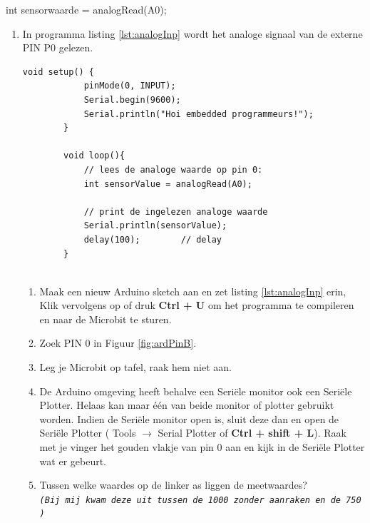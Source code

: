 int sensorwaarde = \textcolor{arduinoOrange}{analogRead}(A0);

\begin{enumerate}
	\item In programma listing \ref{lst:analogInp} wordt het analoge signaal van de externe PIN P0 gelezen.
	\begin{lstlisting}[numbers=none ,caption= inlezen via een analoog signaal.,label={lst:analogInp}]
		void setup() {  
			pinMode(0, INPUT); 
			Serial.begin(9600);
			Serial.println("Hoi embedded programmeurs!");
		}
		
		void loop(){
			// lees de analoge waarde op pin 0:
			int sensorValue = analogRead(A0);
			
			// print de ingelezen analoge waarde
			Serial.println(sensorValue);
			delay(100);        // delay 
		}
		
	\end{lstlisting}
	\begin{enumerate}
		\item  Maak een nieuw Arduino sketch aan en zet listing \ref{lst:analogInp} erin, Klik vervolgens op  of druk \colorbox{mygray}{\textbf{Ctrl + U}} om het programma te compileren en naar de Microbit te sturen. 
		\item Zoek PIN 0 in Figuur \ref{fig:ardPinB}.
		\item Leg je Microbit op tafel, raak hem niet aan. 
		\item De Arduino omgeving heeft behalve een Seriële monitor ook een Seriële Plotter. Helaas kan maar één van beide monitor of plotter gebruikt worden. 
		Indien de Seriële monitor open is, sluit deze dan en open de Seriële Plotter ( Tools $\rightarrow$ Serial Plotter of \colorbox{mygray}{\textbf{Ctrl + shift + L}}).
		Raak met je vinger het gouden vlakje van pin 0 aan en kijk in de Seriële Plotter wat er gebeurt.
		\item Tussen welke waardes op de linker as liggen de meetwaardes? \hrulefill \\	
		\footnotesize{\texttt{\textit{(Bij mij kwam deze uit tussen de 1000 zonder aanraken en de 750 )}} }
		
	\end{enumerate}
	

\end{enumerate}
